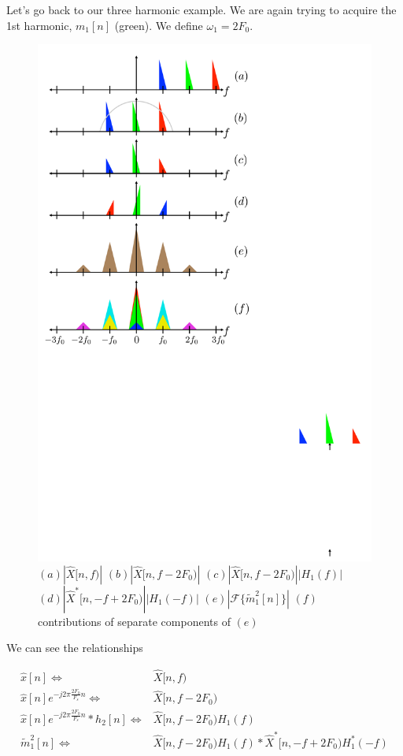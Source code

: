 \documentclass [11pt, proquest] {uwthesis}[2015/03/03]
\begin{document}
Let's go back to our three harmonic example.  We are again trying to acquire the 1st harmonic, $m_1[n]$ (green).  We define $\omega_1 = 2F_0$.

\begin{figure}[!ht]
  \centering
    \includegraphics[width=.62\textwidth]{harmonic_envelope_estimate} 
    \caption{$(a) | \widehat{X}[n,f) |$   
    				$(b) | \widehat{X}[n,f - 2F_0) |$  
				$(c) | \widehat{X}[n,f - 2F_0) | | H_1(f) |$
				$(d) | \widehat{X}^*[n,-f + 2F_0) | | H_1(-f) |$
				$(e) | \mathcal{F} \{ \tilde{m}_1^2[n] \} |$
				$(f)$ contributions of separate components of $(e)$}\label{fig:harmonic_envelope_estimate}
\end{figure}

We can see the relationships

\begin{align}
\label{eq:harmonic_estimate_fig_a}
\widehat{x}[n] \Longleftrightarrow& \widehat{X}[n,f) \\
\widehat{x}[n]e^{-j2\pi \frac{2F_0}{F_s}n} \Longleftrightarrow& \widehat{X}[n,f - 2F_0) \\
\widehat{x}[n]e^{-j2\pi \frac{2F_0}{F_s}n} * h_2[n] \Longleftrightarrow& \widehat{X}[n,f - 2F_0) H_1(f) \\
\label{eq:harmonic_estimate_fig_e}
\tilde{m}_1^2[n] \Longleftrightarrow& \widehat{X}[n,f - 2F_0) H_1(f) * \widehat{X}^*[n,-f + 2F_0) H_1^*(-f)
\end{align}
\end{document}
